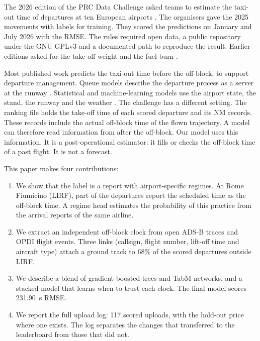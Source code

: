 \documentclass[
  manuscript=article,
  layout=preprint,
  year=2026,
  volume=x,
]{extra/joas}
\begin{document}
The 2026 edition of the PRC Data Challenge asked teams to estimate the taxi-out time of departures at ten European airports \cite{prc2026challenge}. The organisers gave the 2025 movements with labels for training. They scored the predictions on January and July 2026 with the RMSE. The rules required open data, a public repository under the GNU GPLv3 and a documented path to reproduce the result. Earlier editions asked for the take-off weight and the fuel burn \cite{spinielli2025takeoff,sun2026fuel}.

Most published work predicts the taxi-out time before the off-block, to support departure management. Queue models describe the departure process as a server at the runway \cite{idris2002queuing,simaiakis2016queuing}. Statistical and machine-learning models use the airport state, the stand, the runway and the weather \cite{balakrishna2010accuracy,ravizza2013combined,lee2016taxi,herrema2018taxi}. The challenge has a different setting. The ranking file holds the take-off time of each scored departure and its NM records. These records include the actual off-block time of the flown trajectory. A model can therefore read information from after the off-block. Our model uses this information. It is a post-operational estimator: it fills or checks the off-block time of a past flight. It is not a forecast.

This paper makes four contributions:
\begin{enumerate}
  \item We show that the label is a report with airport-specific regimes. At Rome Fiumicino (LIRF), part of the departures report the scheduled time as the off-block time. A regime head estimates the probability of this practice from the arrival reports of the same airline.
  \item We extract an independent off-block clock from open ADS-B traces and OPDI flight events. Three links (callsign, flight number, lift-off time and aircraft type) attach a ground track to 68\% of the scored departures outside LIRF.
  \item We describe a blend of gradient-boosted trees and TabM networks, and a stacked model that learns when to trust each clock. The final model scores 231.90~s RMSE.
  \item We report the full upload log: 117 scored uploads, with the hold-out price where one exists. The log separates the changes that transferred to the leaderboard from those that did not.
\end{enumerate}
\end{document}
